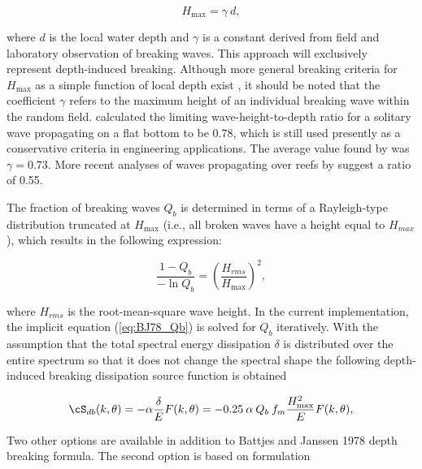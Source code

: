 
\begin{equation}
H_{\max} = \gamma \: d  , \label{eq:BJ78_McC}
\end{equation}

\noindent
where $d$ is the local water depth and $\gamma$ is a constant derived from
field and laboratory observation of breaking waves. This approach will
exclusively represent depth-induced breaking.  Although more general breaking
criteria for $H_{\max}$ as a simple function of local depth exist
\citep[e.g.,][]{art:TG83}, it should be noted that the coefficient $\gamma$
refers to the maximum height of an individual breaking wave within the random
field. \cite{art:M1894} calculated the limiting wave-height-to-depth ratio for
a solitary wave propagating on a flat bottom to be 0.78, which is still used
presently as a conservative criteria in engineering applications. The average
value found by \cite{pro:BJ78} was $\gamma = 0.73$. More recent analyses of
waves propagating over reefs by \cite{art:Nel94, art:Nel97} suggest a ratio of
0.55.

The fraction of breaking waves $Q_b$ is determined in terms of a Rayleigh-type
distribution truncated at $H_{\max}$ (i.e., all broken waves have a height
equal to $H_{max}$), which results in the following expression:


\begin{equation}
\frac{1 - Q_b}{-\ln Q_b} = \left ( \frac{H_{rms}}{H_{\max}} \right ) ^{2}
 , \label{eq:BJ78_Qb}
\end{equation}

\noindent
where $H_{rms}$ is the root-mean-square wave height. In the current
implementation, the implicit equation (\ref{eq:BJ78_Qb}) is solved for $Q_b$
iteratively. With the assumption that the total spectral energy dissipation
$\delta$ is distributed over the entire spectrum so that it does not change
the spectral shape \citep{art:EB96} the following depth-induced breaking
dissipation source function is obtained


\begin{equation}
\cS_{db} (k,\theta) = - \alpha \frac{\delta}{E} F(k,\theta)
       = - 0.25 \: \alpha \: Q_b \: f_m \frac{H_{\max}^2}{E} F(k,\theta)
 , \label{eq:BJ78}
\end{equation}

Two other options are available in addition to Battjes and  Janssen 1978 depth breaking formula. The second option is based on \cite{thornton1983transformation} formulation


